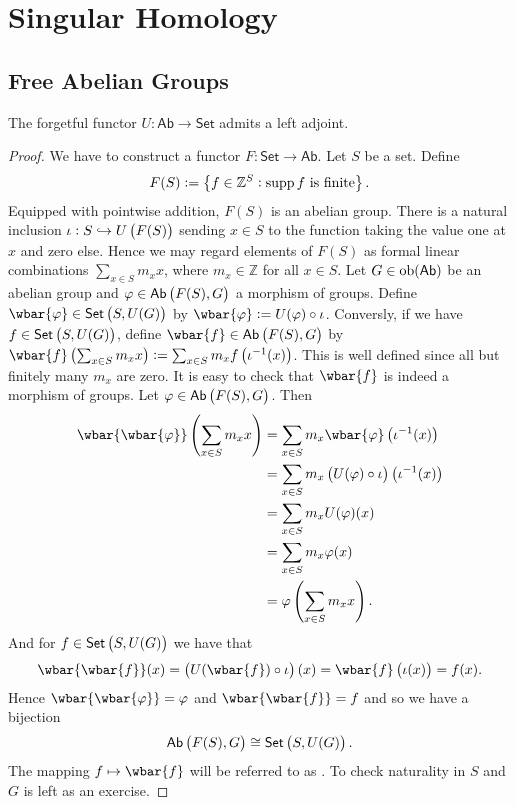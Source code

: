 \chapter{Singular Homology}
\section{Free Abelian Groups}

\begin{proposition}
	The forgetful functor $U : \mathsf{Ab} \to \mathsf{Set}$ admits a left adjoint.
	\label{prop:free_adj_forget}
\end{proposition}

\begin{proof}
	We have to construct a functor $F : \mathsf{Set} \to \mathsf{Ab}$. Let $S$ be a set. Define 
	\begin{equation*}
		F(S) := \cbr[1]{f \in \mathbb{Z}^S : \supp f \text{ is finite}}.
	\end{equation*}
	Equipped with pointwise addition, $F(S)$ is an abelian group. There is a natural inclusion $\iota : S \hookrightarrow U\del[1]{F(S)}$ sending $x \in S$ to the function taking the value one at $x$ and zero else. Hence we may regard elements of $F(S)$ as formal linear combinations $\sum_{x \in S}m_x x$, where $m_x \in \mathbb{Z}$ for all $x \in S$. Let $G \in \operatorname{ob}(\mathsf{Ab})$ be an abelian group and $\varphi \in \mathsf{Ab}\del[1]{F(S), G}$ a morphism of groups. Define $\wbar{\varphi} \in \mathsf{Set}\del[1]{S,U(G)}$ by $\wbar{\varphi} := U(\varphi) \circ \iota$. Conversly, if we have $f \in \mathsf{Set}\del[1]{S,U(G)}$, define $\wbar{f} \in \mathsf{Ab}\del[1]{F(S),G}$ by $\wbar{f}\del[1]{\sum_{x \in S} m_x x} := \sum_{x \in S} m_x f\del[1]{\iota^{-1}(x)}$. This is well defined since all but finitely many $m_x$ are zero. It is easy to check that $\wbar{f}$ is indeed a morphism of groups. Let $\varphi \in \mathsf{Ab}\del[1]{F(S),G}$. Then
	\begin{align*}
		\wbar{\wbar{\varphi}}\del[4]{\sum_{x \in S} m_x x} &= \sum_{x \in S}m_x \wbar{\varphi}\del[1]{\iota^{-1}(x)}\\
		&= \sum_{x \in S} m_x \del[1]{U(\varphi) \circ \iota}\del[1]{\iota^{-1}(x)}\\
		&= \sum_{x \in S} m_x U(\varphi)(x)\\
		&= \sum_{x \in S} m_x \varphi(x)\\
		&= \varphi \del[4]{\sum_{x \in S} m_x x}.
	\end{align*}
	And for $f \in \mathsf{Set}\del[1]{S,U(G)}$ we have that
	\begin{equation*}
		\wbar{\wbar{f}}(x) = \del[1]{U(\wbar{f}) \circ \iota}(x) = \wbar{f}\del[1]{\iota(x)} = f(x). 
	\end{equation*}
	\noindent Hence $\wbar{\wbar{\varphi}} = \varphi$ and $\wbar{\wbar{f}} = f$ and so we have a bijection
	\begin{equation*}
		\mathsf{Ab}\del[1]{F(S),G} \cong \mathsf{Set}\del[1]{S,U(G)}.
	\end{equation*}
	The mapping $f \mapsto \wbar{f}$ will be referred to as . To check naturality in $S$ and $G$ is left as an exercise.
\end{proof}

